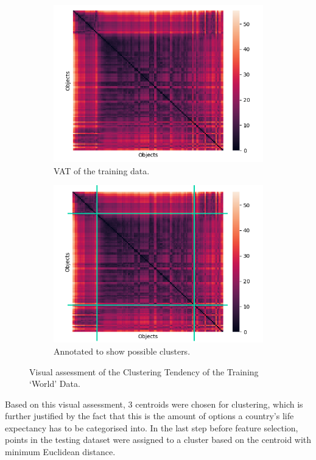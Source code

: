 \documentclass{article}
\begin{document}
\begin{figure}[!ht]
    \centering
    \begin{subfigure}[b]{0.45\linewidth}
      \includegraphics[width=\linewidth]{task2b-VAT.png}
      \caption{VAT of the training data.}
    \end{subfigure}
    \begin{subfigure}[b]{0.45\linewidth}
      \includegraphics[width=\linewidth]{task2b-VAT-annotated.png}
      \caption{Annotated to show possible clusters.}
    \end{subfigure}
    \caption{Visual assessment of the Clustering Tendency of the Training `World' Data.}
    \label{fig:VAT}
\end{figure}
Based on this visual assessment, 3 centroids were chosen for clustering, which is further justified by the fact that this is the amount of options a country's life expectancy has to be categorised into. In the last step before feature selection, points in the testing dataset were assigned to a cluster based on the centroid with minimum Euclidean distance.
\end{document}
